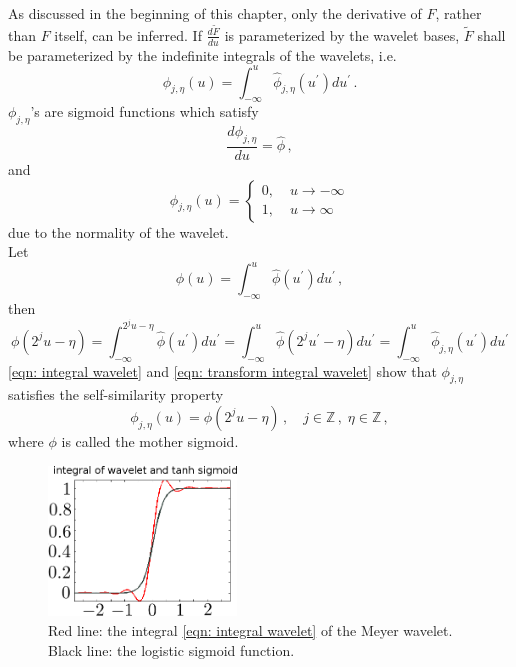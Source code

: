 As discussed in the beginning of this chapter, only the derivative of $F$, rather than 
$F$ itself, can be inferred.
If $\frac{d \tilde{F}}{du}$ is parameterized by the wavelet bases, 
$\tilde{F}$ shall be parameterized by the indefinite integrals of the wavelets, i.e.
\begin{equation}
    \phi_{j,\eta}(u) = \int_{-\infty}^u \hat{\phi}_{j,\eta}(u^\prime) du^\prime\,.
    \label{eqn: integral wavelet}
\end{equation}
$\phi_{j,\eta}$'s are sigmoid functions which satisfy
\begin{equation}
    \frac{d\phi_{j,\eta}}{du} = \hat{\phi}\,,
\end{equation}
and
\begin{equation}
    \phi_{j,\eta}(u) = \left\{
        \begin{split}
            0,&\; u\rightarrow -\infty\\
            1,&\; u\rightarrow \infty
        \end{split}\right.
\end{equation}
due to the normality of the wavelet.\\

Let 
\begin{equation}
    \phi(u) = \int_{-\infty}^u \hat{\phi}(u^\prime) du^\prime\,,
    \label{eqn: integral wavelet basis}
\end{equation}
then
\begin{equation}
    \phi(2^j u-\eta) = \int_{-\infty}^{2^j u-\eta} \hat{\phi}(u^\prime) du^\prime
    = \int_{-\infty}^{u} \hat{\phi} (2^j u^\prime - \eta) du^\prime=
    \int_{-\infty}^u \hat{\phi}_{j,\eta} (u^\prime) du^\prime
    \label{eqn: transform integral wavelet}
\end{equation}
\eqref{eqn: integral wavelet} and \eqref{eqn: transform integral wavelet} show that
$\phi_{j,\eta}$ satisfies the self-similarity property
\begin{equation}
    {\phi}_{j,\eta}(u) = {\phi}(2^j u-\eta) \,,\quad j\in \mathbb{Z} \,,\;\eta \in \mathbb{Z}\,,
    \label{eqn: self similar sigmoid}
\end{equation}
where $\phi$ is called the {mother sigmoid}.\\

\begin{figure}[Htbp]\begin{center}
    \includegraphics[width=5cm, height=4cm]{../basis_combined.png}
    \caption{Red line: the integral \eqref{eqn: integral wavelet} of the Meyer wavelet.
             Black line: the logistic sigmoid function.}
    \label{fig: sigmoid}
\end{center}\end{figure}


